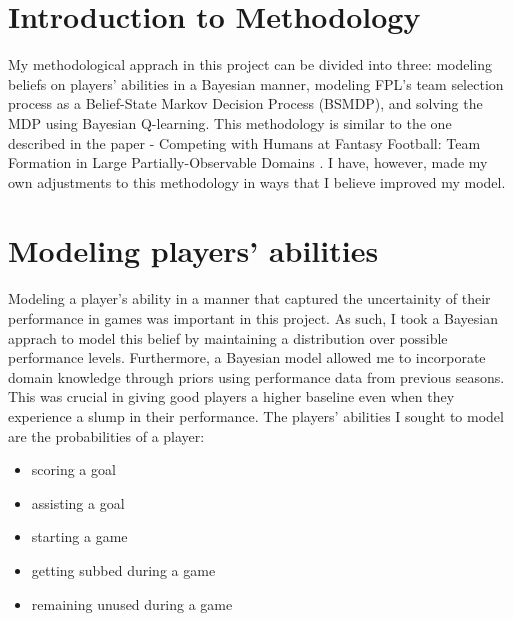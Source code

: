 \section{Introduction to Methodology}
My methodological apprach in this project can be divided into three: modeling beliefs on players' abilities in a Bayesian manner, modeling FPL's team selection process as a Belief-State Markov Decision Process (BSMDP), and solving the MDP using Bayesian Q-learning. This methodology is similar to the one described in the paper - Competing with Humans at Fantasy Football: Team Formation in Large Partially-Observable Domains \cite{matthews2012}. I have, however, made my own adjustments to this methodology in ways that I believe improved my model.

\section{Modeling players' abilities}
Modeling a player's ability in a manner that captured the uncertainity of their performance in games was important in this project. As such, I took a Bayesian apprach to model this belief by maintaining a distribution over possible performance levels. Furthermore, a Bayesian model allowed me to incorporate domain knowledge through priors using performance data from previous seasons. This was crucial in giving good players a higher baseline even when they experience a slump in their performance. The players' abilities I sought to model are the probabilities of a player: 
\begin{itemize}
    \item scoring a goal
    \item assisting a goal
    \item starting a game
    \item getting subbed during a game
    \item remaining unused during a game
\end{itemize}

